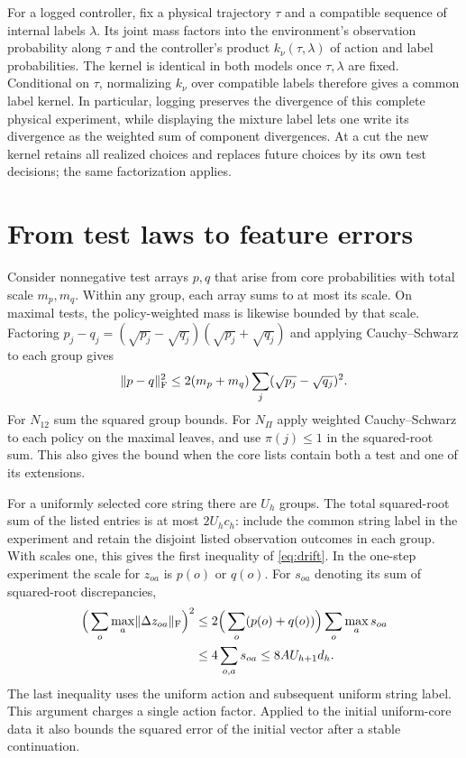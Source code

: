 For a logged controller, fix a physical trajectory $\tau$ and a compatible sequence of internal labels $\lambda$. Its joint mass factors into the environment's observation probability along $\tau$ and the controller's product $k_\nu(\tau,\lambda)$ of action and label probabilities. The kernel is identical in both models once $\tau,\lambda$ are fixed. Conditional on $\tau$, normalizing $k_\nu$ over compatible labels therefore gives a common label kernel. In particular, logging preserves the divergence of this complete physical experiment, while displaying the mixture label lets one write its divergence as the weighted sum of component divergences. At a cut the new kernel retains all realized choices and replaces future choices by its own test decisions; the same factorization applies.

\section{From test laws to feature errors}\label{app:mass}
Consider nonnegative test arrays $p,q$ that arise from core probabilities with total scale $m_p,m_q$. Within any group, each array sums to at most its scale. On maximal tests, the policy-weighted mass is likewise bounded by that scale. Factoring $p_j-q_j=(\sqrt{p_j}-\sqrt{q_j})(\sqrt{p_j}+\sqrt{q_j})$ and applying Cauchy--Schwarz to each group gives
\[
 \lVert p-q\rVert_{\mathrm F}^2
 \le 2(m_p+m_q)\sum_j(\sqrt{p_j}-\sqrt{q_j})^2 .
\]
For $N_{12}$ sum the squared group bounds. For $N_\Pi$ apply weighted Cauchy--Schwarz to each policy on the maximal leaves, and use $\pi(j)\le1$ in the squared-root sum. This also gives the bound when the core lists contain both a test and one of its extensions.

For a uniformly selected core string there are $U_h$ groups. The total squared-root sum of the listed entries is at most $2U_hc_h$: include the common string label in the experiment and retain the disjoint listed observation outcomes in each group. With scales one, this gives the first inequality of \eqref{eq:drift}. In the one-step experiment the scale for $z_{oa}$ is $p(o)$ or $q(o)$. For $s_{oa}$ denoting its sum of squared-root discrepancies,
\begin{align*}
 \Big(\sum_o\max_a\lVert \Delta z_{oa}\rVert_{\mathrm F}\Big)^2
 &\le 2\Big(\sum_o(p(o)+q(o))\Big)\sum_o\max_a s_{oa}\\
 &\le 4\sum_{o,a}s_{oa}\le8AU_{h+1}d_h .
\end{align*}
The last inequality uses the uniform action and subsequent uniform string label. This argument charges a single action factor. Applied to the initial uniform-core data it also bounds the squared error of the initial vector after a stable continuation.

